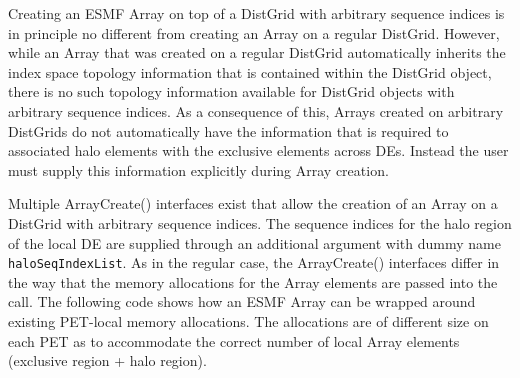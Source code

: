    Creating an ESMF Array on top of a DistGrid with arbitrary sequence indices
   is in principle no different from creating an Array on a regular DistGrid. 
   However, while an Array that was created on a regular DistGrid automatically
   inherits the index space topology information that is contained within the
   DistGrid object, there is no such topology information available for
   DistGrid objects with arbitrary sequence indices. As a consequence of
   this, Arrays created on arbitrary DistGrids do not automatically have
   the information that is required to associated halo elements with the
   exclusive elements across DEs. Instead the user must supply this information
   explicitly during Array creation.
  
   Multiple ArrayCreate() interfaces exist that allow the creation of an Array
   on a DistGrid with arbitrary sequence indices. The sequence indices for the
   halo region of the local DE are supplied through an additional argument
   with dummy name {\tt haloSeqIndexList}. As in the regular case, the
   ArrayCreate() interfaces differ in the way that the memory allocations for
   the Array elements are passed into the call. The following code shows how 
   an ESMF Array can be wrapped around existing PET-local memory allocations.
   The allocations are of different size on each PET as to accommodate the correct
   number of local Array elements (exclusive region + halo region). 

